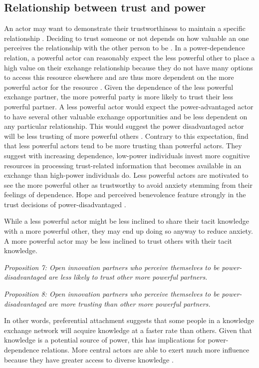 \subsection{Relationship between trust and power}

An actor may want to demonstrate their trustworthiness to maintain a specific relationship \citep{schilke2015power}. Deciding to trust someone or not depends on how valuable an one perceives the relationship with the other person to be \citep{axelrod1984evolution}. In a power-dependence relation, a powerful actor can reasonably expect the less powerful other to place a high value on their exchange relationship because they do not have many options to access this resource elsewhere and are thus more dependent on the more powerful actor for the resource \citep{emerson1962power}. Given the dependence of the less powerful exchange partner, the more powerful party is more likely to trust their less powerful partner. A less powerful actor would expect the power-advantaged actor to have several other valuable exchange opportunities and be less dependent on any particular relationship. This would suggest the power disadvantaged actor will be less trusting of more powerful others \citep{schilke2015power}. Contrary to this expectation, \citet{schilke2015power} find that less powerful actors tend to be more trusting than powerful actors. They suggest with increasing dependence, low-power individuals invest more cognitive resources in processing trust-related information that becomes available in an exchange than high-power individuals do. Less powerful actors are motivated to see the more powerful other as trustworthy to avoid anxiety stemming from their feelings of dependence. Hope and perceived benevolence feature strongly in the trust decisions of power-disadvantaged \citep{schilke2015power}. \medskip

While a less powerful actor might be less inclined to share their tacit knowledge with a more powerful other, they may end up doing so anyway to reduce anxiety. A more powerful actor may be less inclined to trust others with their tacit knowledge. \medskip

\emph{Proposition 7: Open innovation partners who perceive themselves to be power-disadvantaged are less likely to trust other more powerful partners.}

\emph{Proposition 8: Open innovation partners who perceive themselves to be power-disadvantaged are more trusting than other more powerful partners.}

In other words, preferential attachment suggests that some people in a knowledge exchange network will acquire knowledge at a faster rate than others. Given that knowledge is a potential source of power, this has implications for power-dependence relations. More central actors are able to exert much more influence because they have greater access to diverse knowledge \citep{emerson1962power,bonacich1987power}. 

